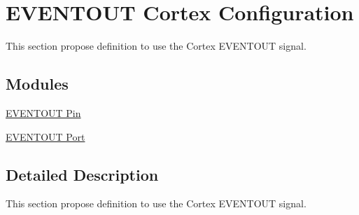 \hypertarget{group___g_p_i_o_ex___e_v_e_n_t_o_u_t}{}\section{E\+V\+E\+N\+T\+O\+UT Cortex Configuration}
\label{group___g_p_i_o_ex___e_v_e_n_t_o_u_t}


This section propose definition to use the Cortex E\+V\+E\+N\+T\+O\+UT signal.  


\subsection*{Modules}
\begin{DoxyCompactItemize}
\item 
\hyperlink{group___g_p_i_o_ex___e_v_e_n_t_o_u_t___p_i_n}{E\+V\+E\+N\+T\+O\+U\+T Pin}
\item 
\hyperlink{group___g_p_i_o_ex___e_v_e_n_t_o_u_t___p_o_r_t}{E\+V\+E\+N\+T\+O\+U\+T Port}
\end{DoxyCompactItemize}


\subsection{Detailed Description}
This section propose definition to use the Cortex E\+V\+E\+N\+T\+O\+UT signal. 

